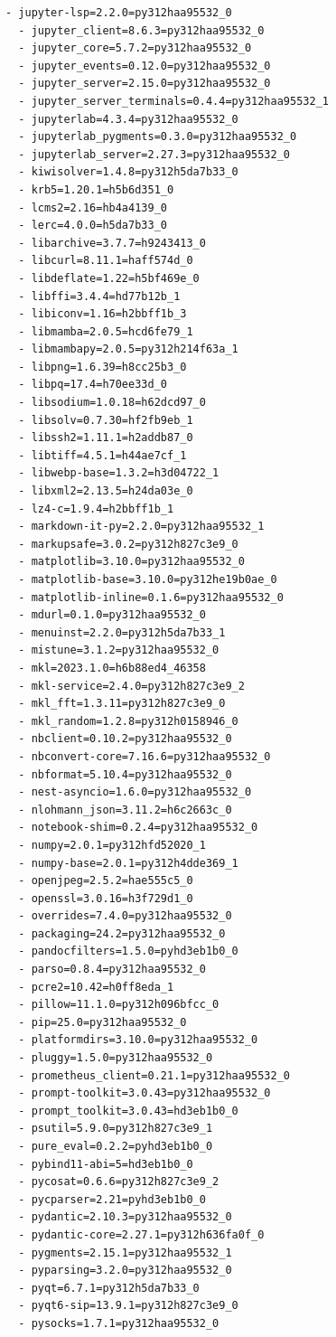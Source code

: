 \documentclass[11pt,a4paper]{article}
\begin{document}
\begin{lstlisting}[caption=Requirements file For Environment Reproduction]
  - jupyter-lsp=2.2.0=py312haa95532_0
  - jupyter_client=8.6.3=py312haa95532_0
  - jupyter_core=5.7.2=py312haa95532_0
  - jupyter_events=0.12.0=py312haa95532_0
  - jupyter_server=2.15.0=py312haa95532_0
  - jupyter_server_terminals=0.4.4=py312haa95532_1
  - jupyterlab=4.3.4=py312haa95532_0
  - jupyterlab_pygments=0.3.0=py312haa95532_0
  - jupyterlab_server=2.27.3=py312haa95532_0
  - kiwisolver=1.4.8=py312h5da7b33_0
  - krb5=1.20.1=h5b6d351_0
  - lcms2=2.16=hb4a4139_0
  - lerc=4.0.0=h5da7b33_0
  - libarchive=3.7.7=h9243413_0
  - libcurl=8.11.1=haff574d_0
  - libdeflate=1.22=h5bf469e_0
  - libffi=3.4.4=hd77b12b_1
  - libiconv=1.16=h2bbff1b_3
  - libmamba=2.0.5=hcd6fe79_1
  - libmambapy=2.0.5=py312h214f63a_1
  - libpng=1.6.39=h8cc25b3_0
  - libpq=17.4=h70ee33d_0
  - libsodium=1.0.18=h62dcd97_0
  - libsolv=0.7.30=hf2fb9eb_1
  - libssh2=1.11.1=h2addb87_0
  - libtiff=4.5.1=h44ae7cf_1
  - libwebp-base=1.3.2=h3d04722_1
  - libxml2=2.13.5=h24da03e_0
  - lz4-c=1.9.4=h2bbff1b_1
  - markdown-it-py=2.2.0=py312haa95532_1
  - markupsafe=3.0.2=py312h827c3e9_0
  - matplotlib=3.10.0=py312haa95532_0
  - matplotlib-base=3.10.0=py312he19b0ae_0
  - matplotlib-inline=0.1.6=py312haa95532_0
  - mdurl=0.1.0=py312haa95532_0
  - menuinst=2.2.0=py312h5da7b33_1
  - mistune=3.1.2=py312haa95532_0
  - mkl=2023.1.0=h6b88ed4_46358
  - mkl-service=2.4.0=py312h827c3e9_2
  - mkl_fft=1.3.11=py312h827c3e9_0
  - mkl_random=1.2.8=py312h0158946_0
  - nbclient=0.10.2=py312haa95532_0
  - nbconvert-core=7.16.6=py312haa95532_0
  - nbformat=5.10.4=py312haa95532_0
  - nest-asyncio=1.6.0=py312haa95532_0
  - nlohmann_json=3.11.2=h6c2663c_0
  - notebook-shim=0.2.4=py312haa95532_0
  - numpy=2.0.1=py312hfd52020_1
  - numpy-base=2.0.1=py312h4dde369_1
  - openjpeg=2.5.2=hae555c5_0
  - openssl=3.0.16=h3f729d1_0
  - overrides=7.4.0=py312haa95532_0
  - packaging=24.2=py312haa95532_0
  - pandocfilters=1.5.0=pyhd3eb1b0_0
  - parso=0.8.4=py312haa95532_0
  - pcre2=10.42=h0ff8eda_1
  - pillow=11.1.0=py312h096bfcc_0
  - pip=25.0=py312haa95532_0
  - platformdirs=3.10.0=py312haa95532_0
  - pluggy=1.5.0=py312haa95532_0
  - prometheus_client=0.21.1=py312haa95532_0
  - prompt-toolkit=3.0.43=py312haa95532_0
  - prompt_toolkit=3.0.43=hd3eb1b0_0
  - psutil=5.9.0=py312h827c3e9_1
  - pure_eval=0.2.2=pyhd3eb1b0_0
  - pybind11-abi=5=hd3eb1b0_0
  - pycosat=0.6.6=py312h827c3e9_2
  - pycparser=2.21=pyhd3eb1b0_0
  - pydantic=2.10.3=py312haa95532_0
  - pydantic-core=2.27.1=py312h636fa0f_0
  - pygments=2.15.1=py312haa95532_1
  - pyparsing=3.2.0=py312haa95532_0
  - pyqt=6.7.1=py312h5da7b33_0
  - pyqt6-sip=13.9.1=py312h827c3e9_0
  - pysocks=1.7.1=py312haa95532_0

\end{lstlisting}
\end{document}

